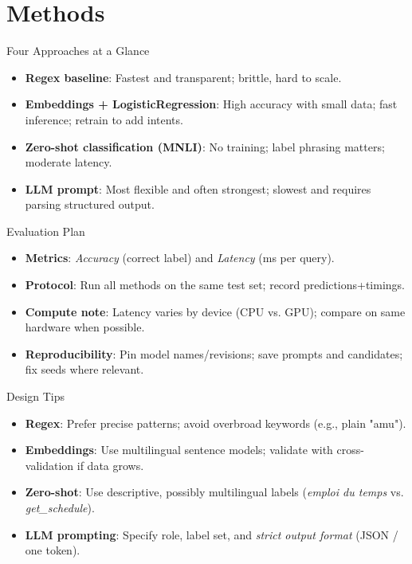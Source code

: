 \documentclass[aspectratio=169]{beamer}
\begin{document}
\section{Methods}

\begin{frame}{Four Approaches at a Glance}
  \begin{itemize}
    \item \textbf{Regex baseline}: Fastest and transparent; brittle, hard to scale.
    \item \textbf{Embeddings + LogisticRegression}: High accuracy with small data; fast inference; retrain to add intents.
    \item \textbf{Zero-shot classification (MNLI)}: No training; label phrasing matters; moderate latency.
    \item \textbf{LLM prompt}: Most flexible and often strongest; slowest and requires parsing structured output.
  \end{itemize}
\end{frame}

\begin{frame}{Evaluation Plan}
  \begin{itemize}
    \item \textbf{Metrics}: \emph{Accuracy} (correct label) and \emph{Latency} (ms per query).
    \item \textbf{Protocol}: Run all methods on the same test set; record predictions+timings.
    \item \textbf{Compute note}: Latency varies by device (CPU vs. GPU); compare on same hardware when possible.
    \item \textbf{Reproducibility}: Pin model names/revisions; save prompts and candidates; fix seeds where relevant.
  \end{itemize}
\end{frame}

\begin{frame}{Design Tips}
  \begin{itemize}
    \item \textbf{Regex}: Prefer precise patterns; avoid overbroad keywords (e.g., plain "amu").
    \item \textbf{Embeddings}: Use multilingual sentence models; validate with cross-validation if data grows.
    \item \textbf{Zero-shot}: Use descriptive, possibly multilingual labels (\emph{emploi du temps} vs. \emph{get\_schedule}).
    \item \textbf{LLM prompting}: Specify role, label set, and \emph{strict output format} (JSON / one token).
  \end{itemize}
\end{frame}
\end{document}
